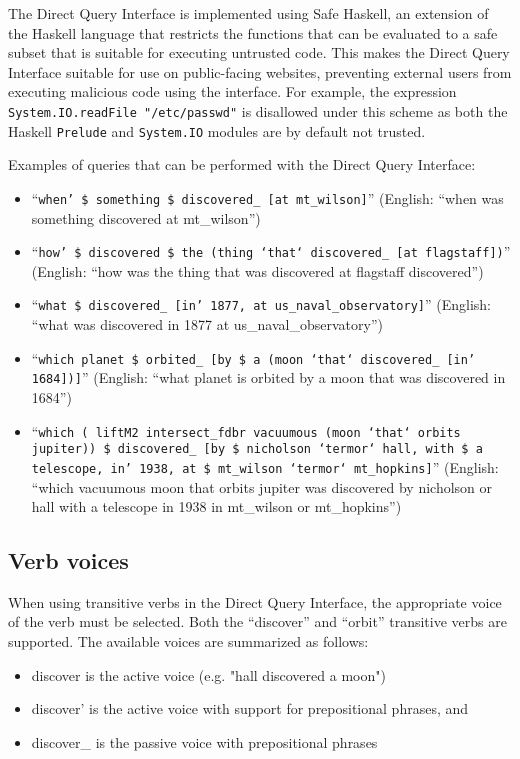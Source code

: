 \documentclass[../main.tex]{subfiles}
\begin{document}
The Direct Query Interface is implemented using Safe Haskell\cite{safehaskell}, an extension of the Haskell language that restricts the functions that can be evaluated
to a safe subset that is suitable for executing untrusted code.  This makes the Direct Query Interface suitable for use on public-facing websites, preventing external users from executing malicious code using the interface.  For example, the expression \texttt{System.IO.readFile "/etc/passwd"} is disallowed under this scheme as both the Haskell \texttt{Prelude} and \texttt{System.IO} modules are by default not trusted.

Examples of queries that can be performed with the Direct Query Interface:
\begin{itemize}
	\item ``\texttt{when' \$ something \$ discovered\_ [at mt\_wilson]}'' (English: ``when was something discovered at mt\_wilson'')
	\item ``\texttt{how' \$ discovered \$ the (thing `that` discovered\_ [at flagstaff])}'' (English: ``how was the thing that was discovered at flagstaff discovered'')
	\item ``\texttt{what \$ discovered\_ [in' 1877, at us\_naval\_observatory]}'' (English: ``what was discovered in 1877 at us\_naval\_observatory'')
	\item ``\texttt{which planet \$ orbited\_ [by \$ a (moon `that` discovered\_ [in' 1684])]}'' (English: ``what planet is orbited by a moon that was discovered in 1684'')
	\item ``\texttt{which ( liftM2 intersect\_fdbr vacuumous  (moon `that` orbits jupiter)) \$ discovered\_ [by \$ nicholson `termor` hall, with \$ a telescope, in' 1938, at \$ mt\_wilson `termor` mt\_hopkins]}'' (English: ``which vacuumous moon that orbits jupiter was discovered by nicholson or hall with a telescope in 1938 in mt\_wilson or mt\_hopkins'')
\end{itemize}

\subsection{Verb voices}

When using transitive verbs in the Direct Query Interface, the appropriate voice of the verb must be selected.  Both the ``discover'' and ``orbit''
transitive verbs are supported.  The available voices are summarized as follows:

\begin{itemize}
	\item discover is the active voice (e.g. "hall discovered a moon")
	\item discover' is the active voice with support for prepositional phrases, and
	\item discover\_ is the passive voice with prepositional phrases
\end{itemize}
\end{document}
